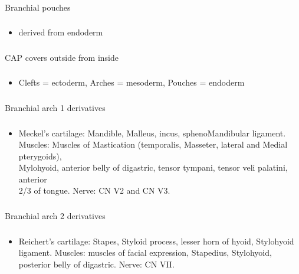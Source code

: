 \documentclass[11pt]{beamer}
\begin{document}
\begin{frame}
 \frametitle{}
Branchial pouches
\end{frame}

\begin{frame}
 \frametitle{}
\begin{itemize}
\item{derived from endoderm}
\end{itemize}
\end{frame}

\begin{frame}
 \frametitle{}
CAP covers outside from inside
\end{frame}

\begin{frame}
 \frametitle{}
\begin{itemize}
\item{Clefts = ectoderm, Arches = mesoderm, Pouches = endoderm}
\end{itemize}
\end{frame}

\begin{frame}
 \frametitle{}
Branchial arch 1 derivatives
\end{frame}

\begin{frame}
 \frametitle{}
\begin{itemize}
\item{Meckel’s cartilage: Mandible, Malleus, incus, sphenoMandibular ligament. Muscles: Muscles of Mastication (temporalis, Masseter, lateral and Medial pterygoids), \\ Mylohyoid, anterior belly of digastric, tensor tympani, tensor veli palatini, anterior \\ 2/3 of tongue. Nerve: CN V2 and CN V3.}
\end{itemize}
\end{frame}

\begin{frame}
 \frametitle{}
Branchial arch 2 derivatives
\end{frame}

\begin{frame}
 \frametitle{}
\begin{itemize}
\item{Reichert’s cartilage: Stapes, Styloid process, lesser horn of hyoid, Stylohyoid ligament. Muscles: muscles of facial expression, Stapedius, Stylohyoid, posterior belly of digastric. Nerve: CN VII.}
\end{itemize}
\end{frame}
\end{document}

